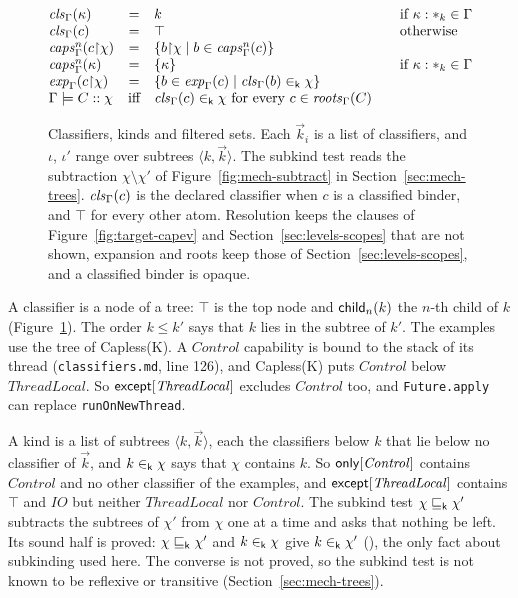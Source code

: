 \begin{figure}[tp]
\[\begin{array}{@{}lcl@{\qquad}l@{}}
\clsof{\Gamma}{\kappa} & = & k & \text{if } \kappa : \clsb{k} \in \Gamma \\
\clsof{\Gamma}{c} & = & \top & \text{otherwise} \\
\capsr{\Gamma}{n}{\restr{c}{\chi}} & = & \cset{\restr{b}{\chi} \mid b \in \capsr{\Gamma}{n}{c}} \\
\capsr{\Gamma}{n}{\kappa} & = & \cset{\kappa} & \text{if } \kappa : \clsb{k} \in \Gamma \\
\expand{\Gamma}{\restr{c}{\chi}} & = & \cset{b \in \expand{\Gamma}{c} \mid \kcont{\clsof{\Gamma}{b}}{\chi}} \\
\kindle{\Gamma}{C}{\chi} & \text{iff} & \kcont{\clsof{\Gamma}{c}}{\chi} \text{ for every } c \in \roots{\Gamma}{C}
\end{array}
\]
\color{black}
\caption{Classifiers, kinds and filtered sets. Each $\vec{k}_i$ is a list of classifiers, and $\iota$, $\iota'$ range over subtrees $\langle k, \vec{k}\rangle$. The subkind test reads the subtraction $\chi \setminus \chi'$ of Figure~\ref{fig:mech-subtract} in Section~\ref{sec:mech-trees}. $\mathit{cls}_{\Gamma}(c)$ is the declared classifier when $c$ is a classified binder, and $\top$ for every other atom. Resolution keeps the clauses of Figure~\ref{fig:target-capev} and Section~\ref{sec:levels-scopes} that are not shown, expansion and roots keep those of Section~\ref{sec:levels-scopes}, and a classified binder is opaque.}
\label{fig:cl-syntax}
\end{figure}

A classifier is a node of a tree: $\top$ is the top node and $\mathsf{child}_{n}(k)$ the $n$-th child of $k$ (Figure~\ref{fig:cl-syntax}). The order $k \le k'$ says that $k$ lies in the subtree of $k'$. The examples use the tree of Capless(K). A $\mathit{Control}$ capability is bound to the stack of its thread (\texttt{classifiers.md}, line 126), and Capless(K) puts $\mathit{Control}$ below $\mathit{ThreadLocal}$. So $\mathsf{except}[\mathit{ThreadLocal}]$ excludes $\mathit{Control}$ too, and \lstinline{Future.apply} can replace \lstinline{runOnNewThread}.

A kind is a list of subtrees $\langle k, \vec{k}\rangle$, each the classifiers below $k$ that lie below no classifier of $\vec{k}$, and $k \mathrel{\in_{\mathsf{k}}} \chi$ says that $\chi$ contains $k$. So $\mathsf{only}[\mathit{Control}]$ contains $\mathit{Control}$ and no other classifier of the examples, and $\mathsf{except}[\mathit{ThreadLocal}]$ contains $\top$ and $\mathit{IO}$ but neither $\mathit{ThreadLocal}$ nor $\mathit{Control}$. The subkind test $\chi \sqsubseteq_{\mathsf{k}} \chi'$ subtracts the subtrees of $\chi'$ from $\chi$ one at a time and asks that nothing be left. Its sound half is proved: $\chi \sqsubseteq_{\mathsf{k}} \chi'$ and $k \mathrel{\in_{\mathsf{k}}} \chi$ give $k \mathrel{\in_{\mathsf{k}}} \chi'$ (), the only fact about subkinding used here. The converse is not proved, so the subkind test is not known to be reflexive or transitive (Section~\ref{sec:mech-trees}).

